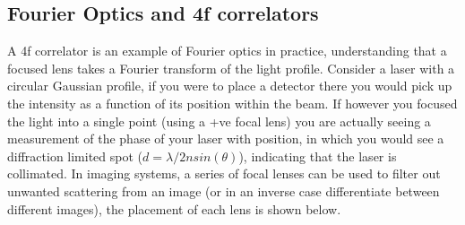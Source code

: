 \subsection{Fourier Optics and 4f correlators}
A 4f correlator is an example of Fourier optics in practice, understanding
that a focused lens takes a Fourier transform of the light profile. 
Consider a laser with a circular Gaussian profile, if you were to place 
a detector there you would pick up the intensity as a function of its 
position within the beam. If however you focused the light into a single 
point (using a +ve focal lens) you are actually seeing a measurement of 
the phase of your laser with position, in which you would see a diffraction
limited spot ($d = \lambda/2nsin(\theta)$), indicating that the laser is 
collimated. In imaging systems, a series of focal lenses can be used to 
filter out unwanted scattering from an image (or in an inverse case 
differentiate between different images), the placement of each lens is shown below.
